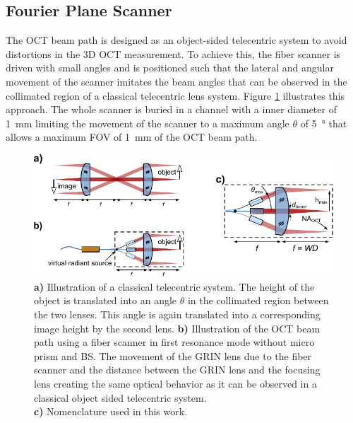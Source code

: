 \subsection{Fourier Plane Scanner}



The OCT beam path is designed as an object-sided telecentric system to avoid distortions in the 3D OCT measurement. To achieve this, the fiber scanner is driven with small angles and is positioned such that the lateral and angular movement of the scanner imitates the beam angles that can be observed in the collimated region of a classical telecentric lens system. Figure \ref{fig:fps} illustrates this approach. The whole scanner is buried in a channel with a inner diameter of \SI{1}{\milli\meter} limiting the movement of the scanner to a maximum angle $\theta$ of \SI{5}{\degree} that allows a maximum FOV of \SI{1}{\milli\meter} of the OCT beam path.



\begin{figure}[h!]\centering \includegraphics[width=\columnwidth]{figures/30_DesignSimulation/fps.pdf}
      \caption{\textbf{a)} Illustration of a classical telecentric system. The height of the object is translated into an angle $\theta$ in the collimated region between the two lenses. This angle is again translated into a corresponding image height by the second lens.
      \textbf{b)} Illustration of the OCT beam path using a fiber scanner in first resonance mode without micro prism and BS. The movement of the GRIN lens due to the fiber scanner and the distance between the GRIN lens and the focusing lens creating the same optical behavior as it can be observed in a classical object sided telecentric system. \\ \textbf{c)} Nomenclature used in this work.}
      \label{fig:fps}
\end{figure}

